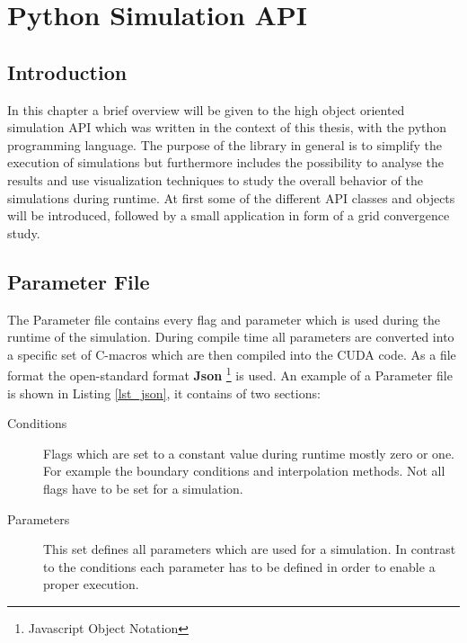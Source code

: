 \chapter{Python Simulation API}

\section{Introduction}

In this chapter a brief overview will be given to the high object oriented simulation API which
was written in the context of this thesis, with the python programming language.
The purpose of the library in general is to simplify the execution of simulations but furthermore
includes the possibility to analyse the results and use visualization techniques to study the overall
behavior of the simulations during runtime.
At first some of the  different API classes and objects will be introduced,
followed by a small application in form of a grid convergence study.

\section{Parameter File}

The Parameter file contains every flag and parameter which is used during the runtime of the simulation.
During compile time all parameters are converted into a specific set of C-macros which are then compiled
into the CUDA code. As a file format the open-standard format \textbf{Json} \footnote{Javascript Object Notation} is used.
An example of a Parameter file is shown in Listing \ref{lst_json}, it contains of two sections:

\begin{description}
\item[Conditions] Flags which are set to a constant value during runtime mostly zero or one. For example the boundary conditions and
                  interpolation methods. Not all flags have to be set for a simulation.
\item[Parameters] This set defines all parameters which are used  for a simulation. In contrast to the conditions each
                  parameter has to be defined in order to enable a proper execution.
\end{description}

